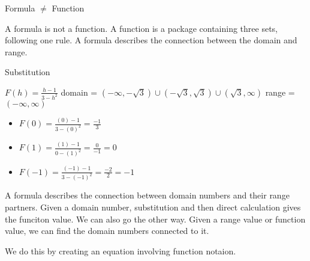 \documentclass{ximera}
\begin{document}
\begin{warning}  Formula $\ne$ Function

A formula is not a function.  A function is a package containing three sets, following one rule.  A formula describes the connection between the domain and range.

\end{warning}





\begin{example}   Substitution

$F(h) = \frac{h-1}{3-h^2}$
domain = $(-\infty, -\sqrt{3}) \cup (-\sqrt{3}, \sqrt{3}) \cup (\sqrt{3}, \infty)$
range = $(-\infty, \infty)$


\begin{itemize}
\item $F(0) = \frac{(0) - 1}{3 - (0)^2} = \frac{-1}{3}$
\item $F(1) = \frac{(1) - 1}{0 - (1)^2} = \frac{0}{-1} = 0$
\item $F(-1) = \frac{(-1) - 1}{3 - (-1)^2} = \frac{-2}{2} = -1$
\end{itemize}

\end{example}



A formula describes the connection between domain numbers and their range partners.  Given a domain number, substitution and then direct calculation gives the funciton value.  We can also go the other way.  Given a range value or function value, we can find the domain numbers connected to it.

We do this by creating an equation involving function notaion.
\end{document}
